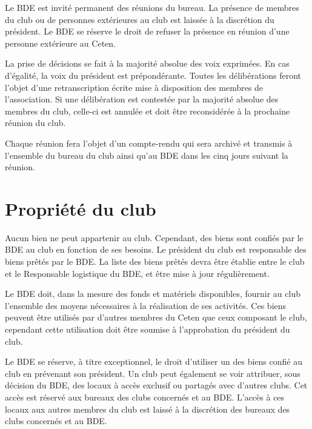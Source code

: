 \documentclass{article}
\begin{document}
\begin{multicols}{2}
{			Le BDE est invité permanent des réunions du bureau. La présence de
			membres du club ou de personnes extérieures au club est laissée à la
			discrétion du président. Le BDE se réserve le droit de refuser la
			présence en réunion d'une personne extérieure au Ceten.

			La prise de décisions se fait à la majorité absolue des voix
			exprimées. En cas d’égalité, la voix du président est prépondérante.
			Toutes les délibérations feront l’objet d’une retranscription écrite
			mise à disposition des membres de l’association. Si une délibération
			est contestée par la majorité absolue des membres du club, celle-ci
			est annulée et doit être reconsidérée à la prochaine réunion du
			club.

			Chaque réunion fera l’objet d’un compte-rendu qui sera archivé et
			transmis à l'ensemble du bureau du club ainsi qu'au BDE dans les
			cinq jours suivant la réunion.
			
		}

		\section{Propriété du club}
\label{sec:propriete_du_club}

		{\small

			Aucun bien ne peut appartenir au club. Cependant, des biens sont
			confiés par le BDE au club en fonction de ses besoins. Le président
			du club est responsable des biens prêtés par le BDE\@. La liste des
			biens prêtés devra être établie entre le club et le Responsable
			logistique du BDE, et être mise à jour régulièrement.

			Le BDE doit, dans la mesure des fonds et matériels disponibles,
			fournir au club l’ensemble des moyens nécessaires à la réalisation
			de ses activités. Ces biens peuvent être utilisés par d’autres
			membres du Ceten que ceux composant le club, cependant cette
			utilisation doit être soumise à l’approbation du président du club.

			Le BDE se réserve, à titre exceptionnel, le droit d’utiliser un des
			biens confié au club en prévenant son président. Un club peut
			également se voir attribuer, sous décision du BDE, des locaux à
			accès exclusif ou partagés avec d’autres clubs. Cet accès est
			réservé aux bureaux des clubs concernés et au BDE\@. L’accès à ces
			locaux aux autres membres du club est laissé à la discrétion des
			bureaux des clubs concernés et au BDE\@.

		}


\end{multicols}
\end{document}
